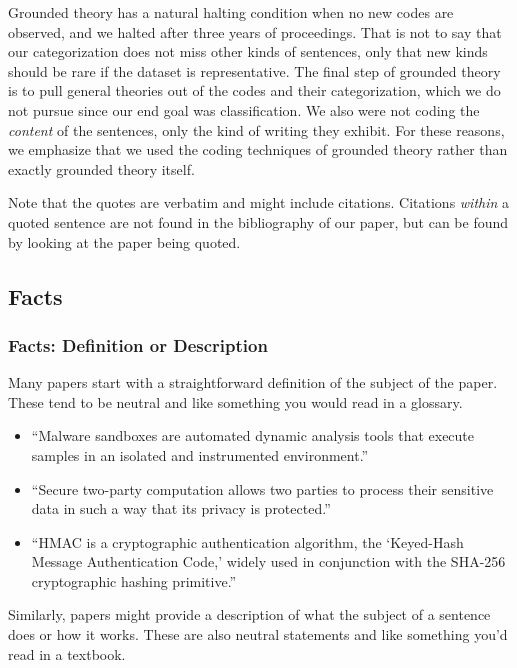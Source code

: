 \documentclass[sigconf]{acmart}
\begin{document}
	Grounded theory has a natural halting condition when no new codes are observed, and we halted after three years of proceedings. That is not to say that our categorization does not miss other kinds of sentences, only that new kinds should be rare if the dataset is representative. The final step of grounded theory is to pull general theories out of the codes and their categorization, which we do not pursue since our end goal was classification. We also were not coding the \textit{content} of the sentences, only the kind of writing they exhibit. For these reasons, we emphasize that we used the coding techniques of grounded theory rather than exactly grounded theory itself.

	Note that the quotes are verbatim and might include citations. Citations \textit{within} a quoted sentence are not found in the bibliography of our paper, but can be found by looking at the paper being quoted.  


	\subsection{Facts}
	\subsubsection{Facts: Definition or Description}

	Many papers start with a straightforward definition of the subject of the paper. These tend to be neutral and like something you would read in a glossary.

	\begin{itemize}

		\item	``Malware sandboxes are automated dynamic analysis tools that execute samples in an isolated and instrumented environment.''~\cite{graziano2015needles}

		\item	``Secure two-party computation allows two parties to process their sensitive data in such a way that its privacy is protected.''~\cite{demmler2014}

		\item	``HMAC is a cryptographic authentication algorithm, the ‘Keyed-Hash Message Authentication Code,’ widely used in conjunction with the SHA-256 cryptographic hashing primitive.''~\cite{beringer2015verified}

	\end{itemize}

	Similarly, papers might provide a description of what the subject of a sentence does or how it works. These are also neutral statements and like something you’d read in a textbook.
\end{document}
